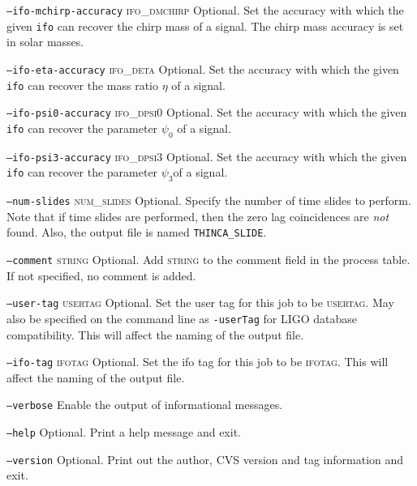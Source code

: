 \begin{entry}
\begin{entry}
\item[\texttt{--ifo-mchirp-accuracy} \textsc{ifo\_dmchirp}] Optional. Set the
accuracy with which the given \texttt{ifo} can recover the chirp mass of a
signal.  The chirp mass accuracy is set in solar masses.

\item[\texttt{--ifo-eta-accuracy} \textsc{ifo\_deta}] Optional. Set the
accuracy with which the given \texttt{ifo} can recover the mass ratio $\eta$
of a signal.

\item[\texttt{--ifo-psi0-accuracy} \textsc{ifo\_dpsi0}] Optional. Set the
accuracy with which the given \texttt{ifo} can recover the parameter
$\psi_{0}$ of a signal.

\item[\texttt{--ifo-psi3-accuracy} \textsc{ifo\_dpsi3}] Optional. Set the
accuracy with which the given \texttt{ifo} can recover the parameter
$\psi_{3}$of a signal.

\item[\texttt{--num-slides} \textsc{num\_slides}] Optional.  Specify the
number of time slides to perform. Note that if time slides are performed, 
then the zero lag coincidences are \textit{not} found. Also, the output file 
is named \texttt{THINCA\_SLIDE}.

\item[\texttt{--comment} \textsc{string}] Optional. Add \textsc{string}
to the comment field in the process table. If not specified, no comment
is added. 

\item[\texttt{--user-tag} \textsc{usertag}] Optional. Set the user tag for
this job to be \textsc{usertag}. May also be specified on the command line as
\texttt{-userTag} for LIGO database compatibility.  This will affect the
naming of the output file.

\item[\texttt{--ifo-tag} \textsc{ifotag}] Optional. Set the ifo tag for this
job to be \textsc{ifotag}. This will affect the naming of the output file.

\item[\texttt{--verbose}] Enable the output of informational messages.

\item[\texttt{--help}] Optional.  Print a help message and exit.

\item[\texttt{--version}] Optional.  Print out the author, CVS version and
tag information and exit.


\end{entry}
\end{entry}
